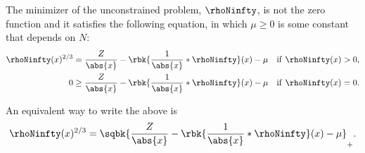 \documentclass[openany, a4paper, oneside]{jsbook}
\begin{document}
\begin{thm}\label{Lieb-Loss_Analysis_chap11_34}
 The minimizer of the unconstrained problem, $\rhoNinfty$, is not the zero function and
 it satisfies the following equation, in which $\mu \geq 0$ is some constant that depends on $N$:
\begin{align}
 \rhoNinfty (x)^{2/3}
 &=
 \frac{Z}{\abs{x}} - \rbk{\frac{1}{\abs{x}} * \rhoNinfty} (x) - \mu & \mathrm{if} \,\, \rhoNinfty (x) > 0, \label{Lieb-Loss_Analysis_chap11_31} \\
 0
 &\geq
 \frac{Z}{\abs{x}} - \rbk{\frac{1}{\abs{x}} * \rhoNinfty} (x) - \mu & \mathrm{if} \,\, \rhoNinfty (x) = 0. \label{Lieb-Loss_Analysis_chap11_29}
\end{align}
\end{thm}
\begin{rem}
 An equivalent way to write the above is
 \begin{align}
  \rhoNinfty (x)^{2/3}
  =
  \sqbk{\frac{Z}{\abs{x}} - \rbk{\frac{1}{\abs{x}} * \rhoNinfty} (x) - \mu}_{+}. \label{Lieb-Loss_Analysis_chap11_32}
 \end{align}
\end{rem}
\end{document}
